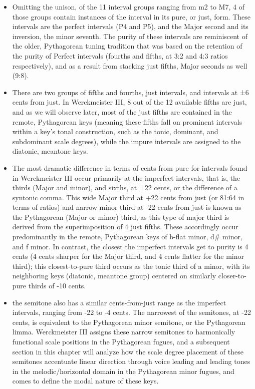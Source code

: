 \begin{itemize}
\tightlist
\item
  Omitting the unison, of the 11 interval groups ranging from m2 to M7,
  4 of those groups contain instances of the interval in its pure, or
  just, form. These intervals are the perfect intervals (P4 and P5), and
  the Major second and its inversion, the minor seventh. The purity of
  these intervals are reminiscent of the older, Pythagorean tuning
  tradition that was based on the retention of the purity of Perfect
  intervals (fourths and fifths, at 3:2 and 4:3 ratios respectively),
  and as a result from stacking just fifths, Major seconds as well
  (9:8).
\item
  There are two groups of fifths and fourths, just intervals, and
  intervals at ±6 cents from just. In Werckmeister III, 8 out of the 12
  available fifths are just, and as we will observe later, most of the
  just fifths are contained in the remote, Pythagorean keys (meaning
  these fifths fall on prominent intervals within a key's tonal
  construction, such as the tonic, dominant, and subdominant scale
  degrees), while the impure intervals are assigned to the diatonic,
  meantone keys.
\item
  The most dramatic difference in terms of cents from pure for intervals
  found in Werckmeister III occur primarily at the imperfect intervals,
  that is, the thirds (Major and minor), and sixths, at ±22 cents, or
  the difference of a syntonic comma. This wide Major third at +22 cents
  from just (or 81:64 in terms of ratios) and narrow minor third at -22
  cents from just is known as the Pythagorean (Major or minor) third, as
  this type of major third is derived from the superimposition of 4 just
  fifths. These accordingly occur predominantly in the remote,
  Pythagorean keys of b-flat minor, d\# minor, and f minor. In contrast,
  the closest the imperfect intervals get to purity is 4 cents (4 cents
  sharper for the Major third, and 4 cents flatter for the minor third);
  this closest-to-pure third occurs as the tonic third of a minor, with
  its neighboring keys (diatonic, meantone group) centered on similarly
  closer-to-pure thirds of -10 cents.
\item
  the semitone also has a similar cents-from-just range as the imperfect
  intervals, ranging from -22 to -4 cents. The narrowest of the
  semitones, at -22 cents, is equivalent to the Pythagorean minor
  semitone, or the Pythagorean limma. Werckmeister III assigns these
  narrow semitones to harmonically functional scale positions in the
  Pythagorean fugues, and a subsequent section in this chapter will
  analyze how the scale degree placement of these semitones accentuate
  linear direction through voice leading and leading tones in the
  melodic/horizontal domain in the Pythagorean minor fugues, and comes
  to define the modal nature of these keys.
\end{itemize}

